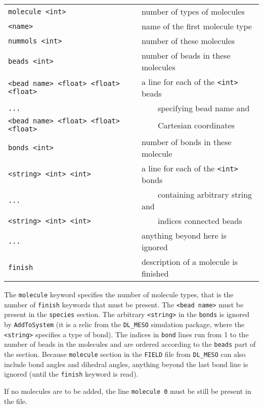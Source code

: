 \noindent
\begin{longtable}{ll}
  \texttt{molecule <int>} & number of types of molecules \\
  \texttt{<name>} & name of the first molecule type \\
  \texttt{nummols <int>} & number of these molecules \\
  \texttt{beads <int>} & number of beads in these molecules \\
  \texttt{<bead name> <float> <float> <float>} & a line for each of the \texttt{<int>} beads \\
  \texttt{...} & \ \ \ \ specifying bead name and \\
  \texttt{<bead name> <float> <float> <float>} & \ \ \ \ Cartesian coordinates \\
  \texttt{bonds <int>} & number of bonds in these molecule \\
  \texttt{<string> <int> <int>} & a line for each of the \texttt{<int>} bonds \\
  \texttt{...} & \ \ \ \ containing arbitrary string and \\
  \texttt{<string> <int> <int>} & \ \ \ \ indices connected beads \\
  \texttt{...} & anything beyond here is ignored \\
  \texttt{finish} & description of a molecule is finished \\
\end{longtable}

The \texttt{molecule} keyword specifies the number of molecule types, that
is the number of \texttt{finish} keywords that must be present. The
\texttt{<bead name>} must be present in the \texttt{species} section. The
arbitrary \texttt{<string>} in the \texttt{bonds} is ignored by
\texttt{AddToSystem} (it is a relic from the \texttt{DL\_MESO} simulation
package, where the \texttt{<string>} specifies a type of bond). The indices
in \texttt{bond} lines run from 1 to the number of beads in the molecules and are
ordered according to the \texttt{beads} part of the section. Because
\texttt{molecule} section in the \texttt{FIELD} file from \texttt{DL\_MESO}
can also include bond angles and dihedral angles, anything beyond the last
bond line is ignored (until the \texttt{finish} keyword is read).

If no molecules are to be added, the line \texttt{molecule 0} must be still
be present in the file.

